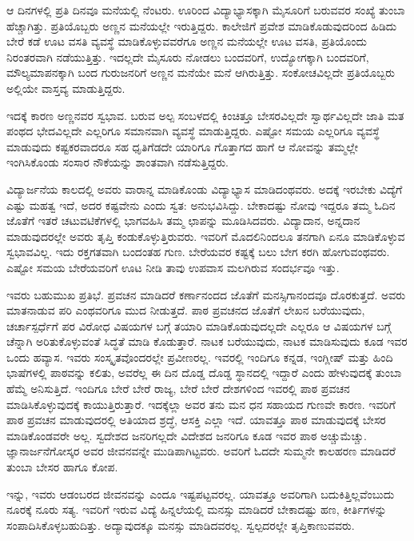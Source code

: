 {ಆ ದಿನಗಳಲ್ಲಿ ಪ್ರತಿ ದಿನವೂ ಮನೆಯಲ್ಲಿ ನೆಂಟರು. ಊರಿಂದ ವಿದ್ಯಾಭ್ಯಾಸಕ್ಕಾಗಿ ಮೈಸೂರಿಗೆ ಬರುವವರ ಸಂಖ್ಯೆ ತುಂಬಾ ಹೆಚ್ಚಾಗಿತ್ತು.  ಪ್ರತಿಯೊಬ್ಬರು ಅಣ್ಣನ ಮನೆಯಲ್ಲೇ ಇರುತ್ತಿದ್ದರು.  ಕಾಲೇಜಿಗೆ ಪ್ರವೇಶ ಮಾಡಿಕೊಡುವುದರಿಂದ ಹಿಡಿದು ಬೇರೆ ಕಡೆ ಊಟ   \enginline{-}   ವಸತಿ ವ್ಯವಸ್ಥೆ ಮಾಡಿಕೊಳ್ಳುವವರೆಗೂ ಅಣ್ಣನ ಮನೆಯಲ್ಲೇ ಊಟ   \enginline{-}   ವಸತಿ, ಪ್ರತಿಯೊಂದು ನಿರಂತರವಾಗಿ ನಡೆಯುತ್ತಿತ್ತು.  ಇದಲ್ಲದೇ ಮೈಸೂರು ನೋಡಲು ಬಂದವರಿಗೆ, ಉದ್ಯೋಗಕ್ಕಾಗಿ ಬಂದವರಿಗೆ, ಮೌಲ್ಯಮಾಪನಕ್ಕಾಗಿ ಬಂದ ಗುರುಜನರಿಗೆ ಅಣ್ಣನ ಮನೆಯೇ  ಮನೆ ಆಗಿರುತ್ತಿತ್ತು.  ಸಂಕೋಚವಿಲ್ಲದೇ  ಪ್ರತಿಯೊಬ್ಬರು ಅಲ್ಲಿಯೇ ವಾಸ್ತವ್ಯ ಮಾಡುತ್ತಿದ್ದರು.  

ಇದಕ್ಕೆ ಕಾರಣ ಅಣ್ಣನವರ ಸ್ವಭಾವ. ಬರುವ ಅಲ್ಪ ಸಂಬಳದಲ್ಲಿ ಕಿಂಚಿತ್ತೂ ಬೇಸರವಿಲ್ಲದೇ ಸ್ವಾರ್ಥವಿಲ್ಲದೇ ಜಾತಿ ಮತ ಪಂಥದ ಭೇದವಿಲ್ಲದೇ ಎಲ್ಲರಿಗೂ ಸಮಾನವಾಗಿ ವ್ಯವಸ್ಥೆ ಮಾಡುತ್ತಿದ್ದರು.  ಎಷ್ಟೋ ಸಮಯ ಎಲ್ಲರಿಗೂ ವ್ಯವಸ್ಥೆ ಮಾಡುವುದು ಕಷ್ಟಕರವಾದರೂ ಸಹ ಧೃತಿಗೆಡದೇ ಯಾರಿಗೂ ಗೊತ್ತಾಗದ ಹಾಗೆ ಆ ನೋವನ್ನು ತಮ್ಮಲ್ಲೇ ಇಂಗಿಸಿಕೊಂಡು ಸಂಸಾರ ನೌಕೆಯನ್ನು ಶಾಂತವಾಗಿ ನಡೆಸುತ್ತಿದ್ದರು.

ವಿದ್ಯಾರ್ಜನೆಯ ಕಾಲದಲ್ಲಿ ಅವರು ವಾರಾನ್ನ ಮಾಡಿಕೊಂಡು ವಿದ್ಯಾಭ್ಯಾಸ ಮಾಡಿದಂಥವರು.  ಅದಕ್ಕೆ ಇರಬೇಕು ವಿದ್ಯೆಗೆ ಎಷ್ಟು ಮಹತ್ವ ಇದೆ, ಅದರ ಕಷ್ಟವೇನು ಎಂದು ಸ್ವತ: ಅನುಭವಿಸಿದ್ದು.  ಬೇಕಾದಷ್ಟು ನೋವು ಇದ್ದರೂ ತಮ್ಮ ಓದಿನ ಜೊತೆಗೆ ಇತರೆ ಚಟುವಟಿಕೆಗಳಲ್ಲಿ ಭಾಗವಹಿಸಿ ತಮ್ಮ ಛಾಪನ್ನು ಮೂಡಿಸಿದವರು.  ವಿದ್ಯಾದಾನ, ಅನ್ನದಾನ ಮಾಡುವುದರಲ್ಲೇ ಅವರು ತೃಪ್ತಿ ಕಂಡುಕೊಳ್ಳುತ್ತಿರುವರು.  ಇವರಿಗೆ ಮೊದಲಿನಿಂದಲೂ ತನಗಾಗಿ ಏನೂ ಮಾಡಿಕೊಳ್ಳುವ ಸ್ವಭಾವವಿಲ್ಲ. ಇದು ರಕ್ತಗತವಾಗಿ ಬಂದಂತಹ ಗುಣ. ಬೇರೆಯವರ ಕಷ್ಟಕ್ಕೆ ಬಲು ಬೇಗ ಕರಗಿ ಹೋಗುವಂಥವರು. ಎಷ್ಟೋ ಸಮಯ ಬೇರೆಯವರಿಗೆ ಊಟ ನೀಡಿ ತಾವು ಉಪವಾಸ ಮಲಗಿರುವ ಸಂದರ್ಭವೂ ಇತ್ತು.  

ಇವರು ಬಹುಮುಖ ಪ್ರತಿಭೆ.   ಪ್ರವಚನ ಮಾಡಿದರೆ ಕರ್ಣಾನಂದದ ಜೊತೆಗೆ ಮನಸ್ಸಿಗಾನಂದವೂ ದೊರಕುತ್ತದೆ.  ಅವರು ಮಾತನಾಡುವ ಪರಿ ಎಂಥವರಿಗೂ ಮುದ ನೀಡುತ್ತದೆ.  ಪಾಠ   \enginline{-}   ಪ್ರವಚನದ ಜೊತೆಗೆ ಲೇಖನ ಬರೆಯುವುದು, ಚರ್ಚಾಸ್ಪರ್ಧೆಗೆ ಪರ ವಿರೋಧ ವಿಷಯಗಳ ಬಗ್ಗೆ ತಯಾರಿ ಮಾಡಿಕೊಡುವುದಲ್ಲದೇ ಎಲ್ಲರೂ ಆ ವಿಷಯಗಳ ಬಗ್ಗೆ ಚೆನ್ನಾಗಿ ಅರಿತುಕೊಳ್ಳುವಂತೆ ಸಿದ್ಧತೆ ಮಾಡಿ ಕೊಡುತ್ತಾರೆ. ನಾಟಕ ಬರೆಯುವುದು, ನಾಟಕ ಮಾಡಿಸುವುದು ಕೂಡ ಇವರ ಒಂದು ಹವ್ಯಾಸ. ಇವರು ಸಂಸ್ಕೃತವೊಂದರಲ್ಲೇ ಪ್ರವೀಣರಲ್ಲ. ಇವರಲ್ಲಿ ಇಂದಿಗೂ ಕನ್ನಡ, ಇಂಗ್ಲೀಷ್ ಮತ್ತು ಹಿಂದಿ ಭಾಷೆಗಳಲ್ಲಿ ಪಾಠವನ್ನು ಕಲಿತು, ಅವರೆಲ್ಲ ಈ ದಿನ ದೊಡ್ಡ ದೊಡ್ಡ ಸ್ಥಾನದಲ್ಲಿ ಇದ್ದಾರೆ ಎಂದು ಹೇಳುವುದಕ್ಕೆ ತುಂಬಾ ಹೆಮ್ಮೆ ಅನಿಸುತ್ತಿದೆ. ಇಂದಿಗೂ ಬೇರೆ ಬೇರೆ ರಾಜ್ಯ, ಬೇರೆ ಬೇರೆ ದೇಶಗಳಿಂದ ಇವರಲ್ಲಿ ಪಾಠ ಪ್ರವಚನ ಮಾಡಿಸಿಕೊಳ್ಳುವುದಕ್ಕೆ  ಕಾಯುತ್ತಿರುತ್ತಾರೆ.  ಇದಕ್ಕೆಲ್ಲಾ ಅವರ ತನು  \enginline{-}  ಮನ  \enginline{-}  ಧನ ಸಹಾಯದ ಗುಣವೇ ಕಾರಣ.  ಇವರಿಗೆ ಪಾಠ ಪ್ರವಚನ ಮಾಡುವುದರಲ್ಲಿ ಅತಿಯಾದ ಶ್ರದ್ಧೆ, ಆಸಕ್ತಿ ಎಲ್ಲಾ ಇದೆ.  ಯಾವತ್ತೂ ಪಾಠ ಮಾಡುವುದಕ್ಕೆ ಬೇಸರ ಮಾಡಿಕೊಂಡವರೇ ಅಲ್ಲ. ಸ್ವದೇಶದ ಜನರಿಗಲ್ಲದೇ ವಿದೇಶದ ಜನರಿಗೂ ಕೂಡ ಇವರ ಪಾಠ ಅಚ್ಚುಮೆಚ್ಚು. ಜ್ಞಾನಾರ್ಜನೆಗೋಸ್ಕರ  ಅವರ  ಜೀವನವನ್ನೇ ಮುಡಿಪಾಗಿಟ್ಟವರು.  ಅವರಿಗೆ ಓದದೇ ಸುಮ್ಮನೇ ಕಾಲಹರಣ ಮಾಡಿದರೆ ತುಂಬಾ ಬೇಸರ ಹಾಗೂ ಕೋಪ. 

ಇನ್ನು, ಇವರು ಆಡಂಬರದ ಜೀವನವನ್ನು ಎಂದೂ ಇಷ್ಟಪಟ್ಟವರಲ್ಲ. ಯಾವತ್ತೂ ಅವರಿಗಾಗಿ ಬದುಕಿತ್ತಿಲ್ಲವೆಂಬುದು ನೂರಕ್ಕೆ ನೂರು ಸತ್ಯ. ಇವರಿಗೆ ಇರುವ ವಿದ್ಯೆ ಹಿನ್ನಲೆಯಲ್ಲಿ ಮನಸ್ಸು ಮಾಡಿದರೆ ಬೇಕಾದಷ್ಟು ಹಣ, ಕೀರ್ತಿಗಳನ್ನು ಸಂಪಾದಿಸಿಕೊಳ್ಳಬಹುದಿತ್ತು.  ಅದ್ಯಾವುದಕ್ಕೂ ಮನಸ್ಸು ಮಾಡಿದವರಲ್ಲ.  ಸ್ವಲ್ಪದರಲ್ಲೇ ತೃಪ್ತಿಕಾಣುವವರು. 

}
